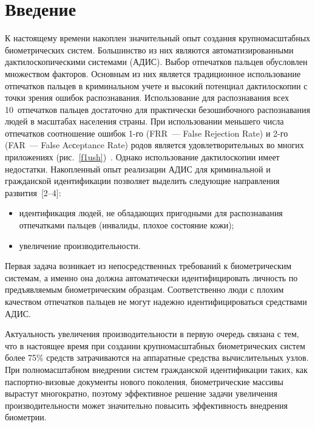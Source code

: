       \begin{multicols}{2}

      \label{st\stat}


\section{Введение}

     К настоящему времени накоплен значительный опыт создания
крупномасштабных био\-мет\-риче\-ских систем. Большинство из них являются %
автоматизированными дактилоскопическими сис\-те\-ма\-ми (АДИС). Выбор
отпечатков пальцев обуслов\-лен множеством факторов. Основным из них является
традиционное использование отпечатков пальцев в криминальном учете и высокий
потенциал дактилоскопии с точки зрения ошибок распознавания. Использование для
распознавания всех 10~отпечатков пальцев достаточно для практически
безошибочного распознавания людей в масштабах на\-се\-ле\-ния страны.  При
использовании меньшего \mbox{числа} отпечатков соотношение ошибок 1-го (FRR~---
False Rejection Rate) и 2-го (FAR~--- False Acсeptance Rate) родов является
удовлетворительных во многих приложениях (рис.~\ref{f1ush})~\cite{1ush}. Однако
использование дактилоскопии имеет недостатки. Накопленный опыт реализации АДИС
для криминальной и гражданской идентификации позволяет выделить сле\-ду\-ющие
направления развития~[2--4]:
\begin{itemize}
\item идентификация людей, не обладающих пригодными для распознавания
отпечатками пальцев (инвалиды, плохое состояние кожи);
\item увеличение производительности.
\end{itemize}

     Первая задача возникает из непосредственных требований к биометрическим
системам, а именно она должна автоматически идентифицировать личность по
предъявляемым биометрическим образцам. Соответственно люди с плохим качеством
отпечатков пальцев не могут надежно идентифицироваться средствами АДИС.

     Актуальность увеличения производительности в первую очередь связана с тем,
что в настоящее время при создании крупномасштабных биометрических систем более
75\% средств затрачиваются на аппаратные средства  вычислительных узлов. При
полномасштабном внедрении систем гражданской идентификации таких, как
пас\-порт\-но-ви\-зо\-вые %
документы нового поколения, биометрические массивы вырастут
многократно, поэтому эффективное решение задачи увеличения про\-из\-во\-ди\-тель\-ности
может значительно повысить эффективность внед\-ре\-ния биометрии.


\end{multicols}
